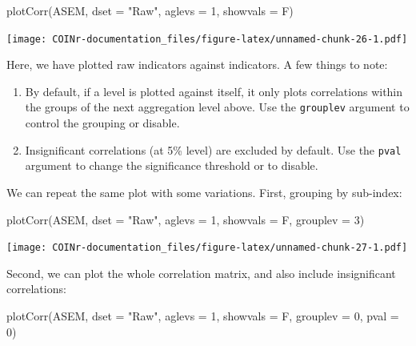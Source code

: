 \documentclass[
]{book}
\newenvironment{Shaded}{\begin{snugshade}}{\end{snugshade}}
\newcommand{\AttributeTok}[1]{\textcolor[rgb]{0.77,0.63,0.00}{#1}}
\newcommand{\DecValTok}[1]{\textcolor[rgb]{0.00,0.00,0.81}{#1}}
\newcommand{\FunctionTok}[1]{\textcolor[rgb]{0.00,0.00,0.00}{#1}}
\newcommand{\NormalTok}[1]{#1}
\newcommand{\StringTok}[1]{\textcolor[rgb]{0.31,0.60,0.02}{#1}}
\providecommand{\tightlist}{%
  \setlength{\itemsep}{0pt}\setlength{\parskip}{0pt}}
\begin{document}
\begin{Shaded}
\begin{Highlighting}[]
\FunctionTok{plotCorr}\NormalTok{(ASEM, }\AttributeTok{dset =} \StringTok{"Raw"}\NormalTok{, }\AttributeTok{aglevs =} \DecValTok{1}\NormalTok{, }\AttributeTok{showvals =}\NormalTok{ F)}
\end{Highlighting}
\end{Shaded}

\texttt{[image: COINr-documentation\_files/figure-latex/unnamed-chunk-26-1.pdf]}

Here, we have plotted raw indicators against indicators. A few things to note:

\begin{enumerate}
\def\labelenumi{\arabic{enumi}.}
\tightlist
\item
  By default, if a level is plotted against itself, it only plots correlations within the groups of the next aggregation level above. Use the \texttt{grouplev} argument to control the grouping or disable.
\item
  Insignificant correlations (at 5\% level) are excluded by default. Use the \texttt{pval} argument to change the significance threshold or to disable.
\end{enumerate}

We can repeat the same plot with some variations. First, grouping by sub-index:

\begin{Shaded}
\begin{Highlighting}[]
\FunctionTok{plotCorr}\NormalTok{(ASEM, }\AttributeTok{dset =} \StringTok{"Raw"}\NormalTok{, }\AttributeTok{aglevs =} \DecValTok{1}\NormalTok{, }\AttributeTok{showvals =}\NormalTok{ F, }\AttributeTok{grouplev =} \DecValTok{3}\NormalTok{)}
\end{Highlighting}
\end{Shaded}

\texttt{[image: COINr-documentation\_files/figure-latex/unnamed-chunk-27-1.pdf]}

Second, we can plot the whole correlation matrix, and also include insignificant correlations:

\begin{Shaded}
\begin{Highlighting}[]
\FunctionTok{plotCorr}\NormalTok{(ASEM, }\AttributeTok{dset =} \StringTok{"Raw"}\NormalTok{, }\AttributeTok{aglevs =} \DecValTok{1}\NormalTok{, }\AttributeTok{showvals =}\NormalTok{ F, }\AttributeTok{grouplev =} \DecValTok{0}\NormalTok{, }\AttributeTok{pval =} \DecValTok{0}\NormalTok{)}
\end{Highlighting}
\end{Shaded}
\end{document}
